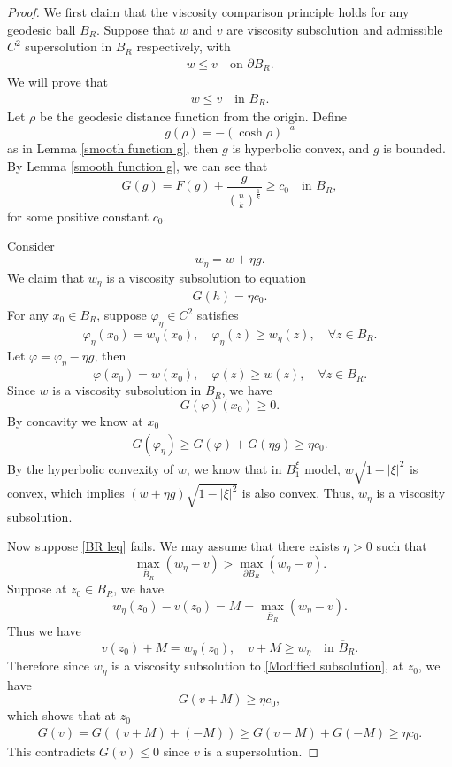 \documentclass[10pt,a4paper]{amsart}
\begin{document}
\begin{proof}
    We first claim that the viscosity comparison principle holds for any geodesic ball $B_R$. Suppose that $w$ and $v$ are viscosity subsolution and admissible $C^2$ supersolution in $B_R$ respectively, with
    \begin{align}
        w \leqslant v \quad \text{on } \partial B_R. 
    \end{align}
    We will prove that
    \begin{align}
        w \leqslant v \quad \text{in } B_R. \label{BR leq}
    \end{align}
    Let $\rho$ be the geodesic distance function from the origin. Define
    \[
    g(\rho) = - \left( \cosh \rho \right)^{-a}
    \]
    as in Lemma \ref{smooth function g}, then $g$ is hyperbolic convex, and $g$ is bounded. By Lemma \ref{smooth function g}, we can see that    
    \[
    G(g)=F(g) + \frac{g}{\binom{n}{k}^{\frac{1}{k}}}\geqslant c_0 \quad \text{in } B_R,
    \]
    for some positive constant $c_0$. 
 
    Consider 
    \[
    w_\eta = w + \eta g.
    \]
    We claim that $w_\eta$ is a viscosity subsolution to equation
    \begin{align}\label{Modified subsolution}
        G(h) = \eta c_0.
    \end{align}
    For any $x_0 \in B_R$, suppose  $\varphi_{\eta} \in C^2$ satisfies 
    \[
    \varphi_{\eta}(x_0) = w_{\eta}(x_0), \quad \varphi_{\eta}(z) \geqslant w_{\eta}(z), \quad \mathbb\forall z \in B_R.
    \]
    Let $\varphi = \varphi_{\eta} - \eta g$, then
    \[
    \varphi(x_0) = w(x_0), \quad \varphi(z) \geqslant w(z), \quad \mathbb\forall z \in B_R.
    \]
    Since $w$ is a viscosity subsolution in $B_R$, we have
    \[
    G(\varphi)(x_0) \geqslant 0.
    \]
    By concavity we know at $x_0$
    \begin{align*}
        G(\varphi_{\eta}) \geqslant G(\varphi) + G(\eta g) \geqslant \eta c_0.
    \end{align*}
    By the hyperbolic convexity of $w$, we know that in $B_1^\xi$ model, $w \sqrt{1-|\xi|^2}$ is convex, which implies 
    $(w +\eta g)\sqrt{1-|\xi|^2}$ is also convex. Thus, $w_{\eta}$ is a viscosity subsolution.     
    
    
    Now suppose \eqref{BR leq} fails. We may assume  that there exists $\eta>0$ such that 
    \[
    \max_{\overline{B}_R} \left( w_{\eta}-v \right) > \max_{\partial B_R} \left( w_{\eta}-v \right).
    \]
    Suppose at $z_0 \in B_R$, we have
    \[
    w_{\eta}(z_0)-v(z_0) = M = \max_{\overline{B}_R} \left( w_{\eta}-v \right).
    \]
    Thus we have
    \[
    v(z_0) + M = w_{\eta}(z_0), \quad v + M \geqslant w_{\eta} \quad \text{in } \overline{B}_R.
    \]
    Therefore since $w_{\eta}$ is a viscosity subsolution to \eqref{Modified subsolution}, at $z_0$, we have
    \[
    G(v+M) \geqslant \eta c_0,
    \]
    which shows that at $z_0$
    \begin{align*}
        G(v) = G((v+M) + (-M)) \geqslant G(v+M) + G(-M) \geqslant \eta c_0.
    \end{align*}
    This contradicts $G(v) \leqslant 0$ since $v$ is a supersolution.


\end{proof}
\end{document}
